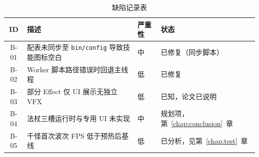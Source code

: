 \begin{table}[htbp]
  \centering
  \caption{缺陷记录表}
  \begin{tabular}{clll}
    \toprule
    ID & 描述 & 严重性 & 状态 \\
    \midrule
    B-01 & 配表未同步至 \texttt{bin/config} 导致技能图标空白 & 中 & 已修复（同步脚本） \\
    B-02 & Worker 脚本路径错误时回退主线程 & 低 & 已修复 \\
    B-03 & 部分 Effect 仅 UI 展示无独立 VFX & 低 & 已知，论文已说明 \\
    B-04 & 法杖三槽运行时与专用 UI 未实现 & 中 & 规划项，第~\ref{chap:conclusion}~章 \\
    B-05 & 千怪首次波次 FPS 低于预热后基线 & 低 & 已分析，见第~\ref{chap:test}~章 \\
    \bottomrule
  \end{tabular}
\end{table}
